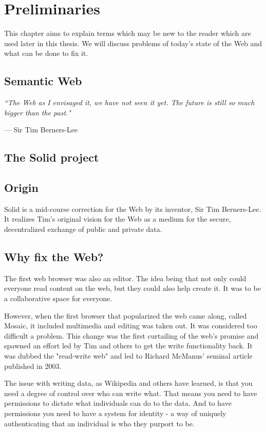 \setlength{\epigraphwidth}{.5\textwidth}
\setlength\epigraphrule{0pt}

\chapter{Preliminaries}
This chapter aims to explain terms which may be new to the reader which are used later in this thesis.
We will discuss problems of today's state of the Web and what can be done to fix it.

\section{Semantic Web}
\epigraph{\textit{``The Web as I envisaged it, we have not seen it yet. The future is still so much bigger than the past."}}{--- Sir Tim Berners-Lee}



\section{The Solid project}

\section*{Origin}
Solid is a mid-course correction for the Web by its inventor, Sir Tim Berners-Lee. It realizes Tim's original vision for the Web as a medium for the secure, decentralized exchange of public and private data.

\section*{Why fix the Web?}
The first web browser was also an editor. The idea being that not only could everyone read content on the web, but they could also help create it. It was to be a collaborative space for everyone.

However, when the first browser that popularized the web came along, called Mosaic, it included multimedia and editing was taken out. It was considered too difficult a problem. This change was the first curtailing of the web's promise and spawned an effort led by Tim and others to get the write functionality back. It was dubbed the "read-write web" and led to Richard McManus' seminal article published in 2003.

The issue with writing data, as Wikipedia and others have learned, is that you need a degree of control over who can write what. That means you need to have permissions to dictate what individuals can do to the data. And to have permissions you need to have a system for identity - a way of uniquely authenticating that an individual is who they purport to be.

